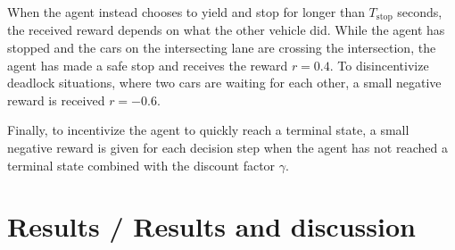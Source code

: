 When the agent instead chooses to yield and stop for longer than $T_\mathrm{stop}$ seconds, the received reward depends on what the other vehicle did. 
While the agent has stopped and the cars on the intersecting lane are crossing the intersection, the agent has made a safe stop and receives the reward $r=0.4$. To disincentivize deadlock situations, where two cars are waiting for each other, a small negative reward is received $r=-0.6$. 

Finally, to incentivize the agent to quickly reach a terminal state, a small negative reward is given for each decision step when the agent has not reached a terminal state combined with the discount factor $\gamma$. 





\section{Results / Results and discussion}
\label{sec:results}

